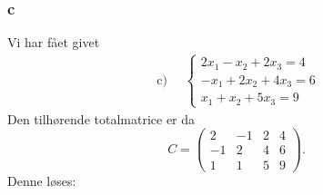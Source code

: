 		\subsubsection{c}

		Vi har fået givet 
			\begin{align*}
				\text { c) } \quad\left\{\begin{array}{r}{2 x_{1}-x_{2}+2x_{3}=4} \\ {-x_{1}+2 x_{2}+4 x_{3}=6} \\ {x_{1}+x_{2}+5 x_{3}=9}\end{array}\right.
			\end{align*}
		Den tilhørende totalmatrice er da
			\begin{equation}
				C=\left(\begin{array}{rrr|r} {2} & {-1} & {2} & {4} \\ {-1} & {2} & {4} & {6} \\ {1} & {1} & {5} & {9} \end{array}\right).
			\end{equation}
		Denne løses:
